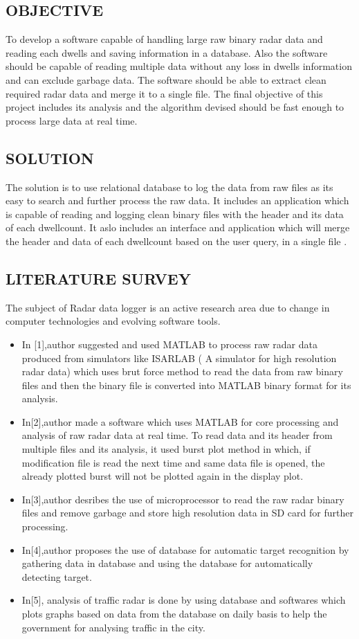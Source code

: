 \documentclass[14pt]{article} %
\begin{document}
\subsection{OBJECTIVE}
 To develop a software capable of handling large raw binary radar data and reading each dwells and saving information in a database. Also the software should be capable of reading multiple data without any loss in dwells information and can exclude garbage data. The software should be able to extract clean required radar data and merge it to a single file. The final objective of this project includes its analysis and the algorithm devised should be fast enough to process large data at real time. 

\subsection{SOLUTION} 
 The solution is to use relational database to log the data from raw files as its easy to search and further process the raw data. It  includes an application which is capable of reading and logging clean binary files with the header and its data of each dwellcount.
 It aslo includes an interface and application which will merge the header and data of each dwellcount based on the user query,  in a single file .
 
 \subsection{LITERATURE SURVEY}
 The subject of Radar data logger is an active research area due to change in computer technologies and evolving software tools.
 \begin{itemize}
 \item In [1],author suggested and used MATLAB to process raw radar data produced from simulators like ISARLAB ( A simulator for high resolution radar data) which uses brut force method to read the data from raw binary files and then the binary file is converted into MATLAB binary format for its analysis.
 \item In[2],author made a software which uses MATLAB for core processing and analysis of raw radar data at real time. To read data and its header from multiple files and its analysis, it used burst plot method in which, if modification file is read the next time and same data file is opened, the already plotted burst will not be plotted again in the display plot.
 \item In[3],author desribes the use of microprocessor to read the raw radar binary files and remove garbage and store high resolution data in SD card for further processing.
 \item In[4],author proposes the use of database for automatic target recognition by gathering data in database and using the database for automatically detecting target.
 \item In[5], analysis of traffic radar is done by using database and softwares which plots graphs based on data from the database on daily basis to help the government for analysing traffic in the city.
 \end{itemize}
\end{document}
